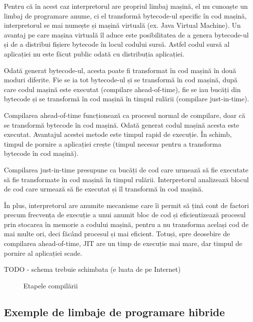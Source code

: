 Pentru că în acest caz interpretorul are propriul limbaj mașină, el nu cunoaște
un limbaj de programare anume, ci el transformă bytecode-ul specific în cod
mașină, interpretorul se mai numește și mașină virtuală (ex. Java Virtual
Machine). Un avantaj pe care mașina virtuală îl aduce este posibilitatea de a
genera bytecode-ul și de a distribui fișiere bytecode în locul codului sursă.
Astfel codul sursă al aplicației nu este făcut public odată cu distribuția
aplicației.

Odată generat bytecode-ul, acesta poate fi transformat în cod mașină în două
moduri diferite. Fie se ia tot bytecode-ul și se transformă în cod mașină, după
care codul mașină este executat (compilare ahead-of-time), fie se iau bucăți din
bytecode și se transformă în cod mașină în timpul rulării (compilare
just-in-time).

Compilarea ahead-of-time funcționează ca procesul normal de compilare, doar că
se transformă bytecode în cod mașină. Odată generat codul mașină acesta este
executat. Avantajul acestei metode este timpul rapid de execuție. În schimb,
timpul de pornire a aplicației crește (timpul necesar pentru a transforma
bytecode în cod mașină).

Compilarea just-in-time presupune ca bucăți de cod care urmează să fie executate
să fie transformate în cod mașină în timpul rulării. Interpretorul analizează
blocul de cod care urmează să fie executat și îl transformă în cod mașină.

În plus, interpretorul are anumite mecanisme care îi permit să țină cont de
factori precum frecvența de execuție a unui anumit bloc de cod și eficientizează
procesul prin stocarea în memorie a codului mașină, pentru a nu transforma
același cod de mai multe ori, deci făcând procesul și mai eficient. Totuși, spre
deosebire de compilarea ahead-of-time, JIT  are un
timp de execuție mai mare, dar timpul de pornire al aplicației scade.

TODO - schema trebuie schimbata (e luata de pe Internet)
\begin{figure}[htbp]
	\centering
	\def\svgwidth{\columnwidth}
	
	\caption{Etapele compilării}
\end{figure}


\subsection{Exemple de limbaje de programare hibride}
\label{sec:appdev-langs-hybrid-ex}


